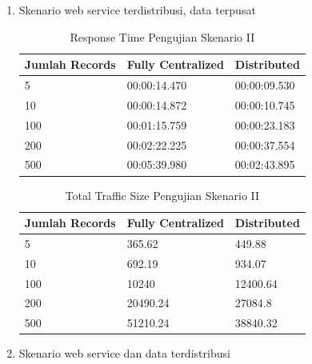 \begin{enumerate}
\item Skenario web service terdistribusi, data terpusat

\begin{table}
\begin{minipage}{\linewidth}
\centering
\begin{tabular}{|l|l|l|}
\hline
\textbf{Jumlah Records} & \textbf{Fully Centralized} & \textbf{Distributed} \\ \hline
5           & 00:00:14.470            & 00:00:09.530                  \\ \hline
10           & 00:00:14.872            & 00:00:10.745                  \\ \hline
100           & 00:01:15.759         & 00:00:23.183                  \\ \hline
200           & 00:02:22.225             & 00:00:37.554                 \\ \hline
500           & 00:05:39.980             & 00:02:43.895                 \\ \hline
\end{tabular}
\caption{Response Time Pengujian Skenario II}
\label{table:testing-2-response-time}
\end{minipage}
\end{table}

\begin{table}
\begin{minipage}{\linewidth}
\centering
\begin{tabular}{|l|l|l|}
\hline
\textbf{Jumlah Records} & \textbf{Fully Centralized} & \textbf{Distributed} \\ \hline
5           & 365.62            & 449.88                  \\ \hline
10           & 692.19            & 934.07                  \\ \hline
100           & 10240         & 12400.64                  \\ \hline
200           & 20490.24             & 27084.8                 \\ \hline
500           & 51210.24             & 38840.32                 \\ \hline
\end{tabular}
\caption{Total Traffic Size Pengujian Skenario II}
\label{table:testing-2-traffic}
\end{minipage}
\end{table}

\item Skenario web service dan data terdistribusi


\end{enumerate}
